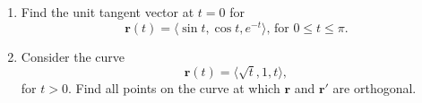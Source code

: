 \documentclass[%
]{article}
\newcommand{\vect}[1]{\mathbf{#1}}
\begin{document}
\begin{enumerate}

\item %
Find the unit tangent vector at $t=0$ for 
\[
\vect r(t)=\langle \sin t,\cos t,e^{-t}\rangle\text{, for }0\leq t\leq \pi.
\]







\item %
Consider the curve 
\[
\vect r(t)=\langle \sqrt t,1,t\rangle,
\]
for $t>0$.  Find all points on the curve at which $\vect r$ and $\vect r'$ are orthogonal.



\end{enumerate}
\end{document}
